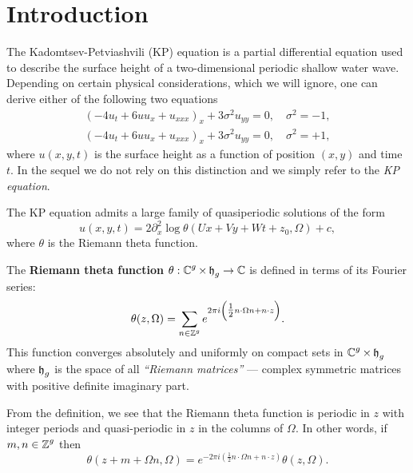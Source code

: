 \section{Introduction}

The Kadomtsev-Petviashvili (KP) equation is a partial differential
equation used to describe the surface height of a two-dimensional
periodic shallow water wave. Depending on certain physical
considerations, which we will ignore, one can derive either of the
following two equations
\begin{align}
  \left(-4u_t + 6uu_x + u_{xxx}\right)_x + 3\sigma^2 u_{yy} = 0, \quad
  \sigma^2 = -1, \label{eqn: KP1} \\
  \left(-4u_t + 6uu_x + u_{xxx}\right)_x + 3\sigma^2 u_{yy} = 0, \quad
  \sigma^2 = +1, \label{eqn: KP2}
\end{align}
where $u(x,y,t)$ is the surface height as a function of position $(x,y)$
and time $t$. In the sequel we do not rely on this distinction and we
simply refer to the {\it KP equation}.

The KP equation admits a large family of quasiperiodic solutions of the
form
\begin{equation} \label{eqn: kpsol}
  u(x,y,t) = 2 \partial_x^2 \log \theta(Ux+Vy+Wt+z_0, \Omega) + c,
\end{equation}
where $\theta$ is the Riemann theta function.

\begin{definition} \label{def: riemanntheta}
  The {\bf Riemann theta function} $\theta: \operatorname{\mathbb{C}}^g \times \operatorname{\mathfrak{h}}_g \to \operatorname{\mathbb{C}}$
  is defined in terms of its Fourier series:
  \begin{equation} \label{eqn: riemanntheta}
    \theta(z,\Omega) = \sum_{n \in \operatorname{\mathbb{Z}}^g}
    e^{2 \pi i \left( \tfrac{1}{2} n \cdot \Omega n + n \cdot z \right)}.
  \end{equation}
  This function converges absolutely and uniformly on compact sets in
  $\operatorname{\mathbb{C}}^g \times \operatorname{\mathfrak{h}}_g$ where $\operatorname{\mathfrak{h}}_g$ is the space of all {\it ``Riemann
    matrices''} --- complex symmetric matrices with positive definite
  imaginary part.
\end{definition}

From the definition, we see that the Riemann theta function is periodic
in $z$ with integer periods and quasi-periodic in $z$ in the columns of
$\Omega$. In other words, if $m,n \in \operatorname{\mathbb{Z}}^g$ then
\begin{equation} \label{eq: quasiperiodicity}
    \theta(z + m + \Omega n, \Omega) =
    e^{-2 \pi i \left( \tfrac{1}{2} n \cdot \Omega n + n \cdot z \right) }
    \theta(z, \Omega).
\end{equation}

